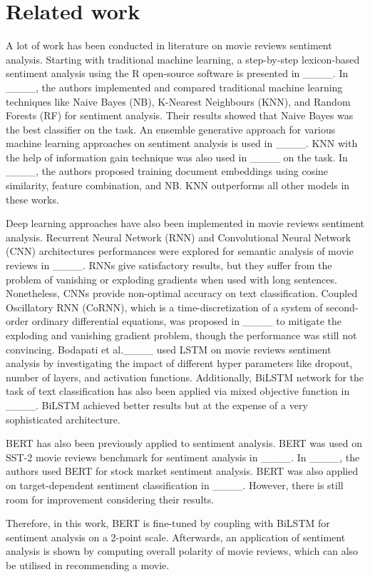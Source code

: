 \section{Related work}
\label{RelatedWork}
A lot of work has been conducted in literature on movie reviews sentiment analysis. Starting with traditional machine learning, a step-by-step lexicon-based sentiment analysis using the R open-source software is presented in ____. In ____, the authors implemented and compared traditional machine learning techniques like Naive Bayes (NB), K-Nearest Neighbours (KNN), and  Random Forests (RF) for sentiment analysis. Their results showed that Naive Bayes was the best classifier on the task. An ensemble generative approach for various machine learning approaches on sentiment analysis is used in ____. KNN with the help of information gain technique was also used in ____ on the task. In ____, the authors proposed training document embeddings using cosine similarity, feature combination, and NB. KNN outperforms all other models in these works.

Deep learning approaches have also been implemented in movie reviews sentiment analysis. Recurrent Neural Network (RNN) and Convolutional Neural Network (CNN) architectures performances were explored for semantic analysis of movie reviews in ____. RNNs give satisfactory results, but they suffer from the problem of vanishing or exploding gradients when used with long sentences. Nonetheless, CNNs provide non-optimal accuracy on text classification. Coupled Oscillatory RNN (CoRNN), which is a time-discretization of a system of second-order ordinary differential equations, was proposed in ____ to mitigate the exploding and vanishing gradient problem, though the performance was still not convincing.  Bodapati et al.____ used LSTM on movie reviews sentiment analysis by investigating the impact of different hyper parameters like dropout, number of layers, and activation functions. Additionally, BiLSTM network for the task of text classification has also been applied via mixed objective function in ____. BiLSTM achieved better results but at the expense of a very sophisticated architecture.  %

BERT has also been previously applied to sentiment analysis. BERT was used on SST-2 movie reviews benchmark for sentiment analysis in ____. In ____, the authors used BERT for stock market sentiment analysis. BERT was also applied on target-dependent sentiment classification in ____. However, there is still room for improvement considering their results. 

Therefore, in this work, BERT is fine-tuned  by coupling with BiLSTM for sentiment analysis on a 2-point scale. Afterwards, an application of sentiment  analysis is shown by computing overall polarity of movie reviews, which can also be utilised in recommending a movie.